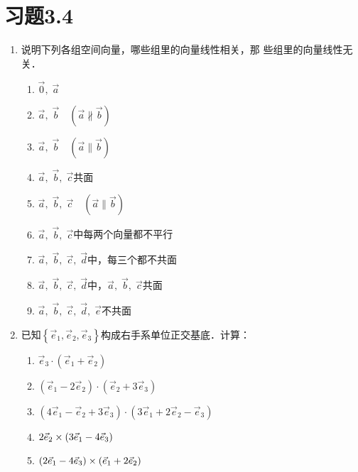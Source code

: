 \section*{习题3.4}

\begin{enumerate}
    \item 说明下列各组空间向量，哪些组里的向量线性相关，那
    些组里的向量线性无关．
    \begin{multicols}{2}
\begin{enumerate}
    \item $\vec{0},\; \vec{a}$
    \item $\vec{a},\; \vec{b}\quad (\vec{a}\nparallel\vec{b})$
    \item $\vec{a},\; \vec{b}\quad (\vec{a}\parallel\vec{b})$
    \item $\vec{a},\; \vec{b},\; \vec{c}$共面
    \item $\vec{a},\; \vec{b},\; \vec{c}\quad (\vec{a}\parallel\vec{b})$
    \item $\vec{a},\; \vec{b},\; \vec{c}$中每两个向量都不平行
    \item $\vec{a},\; \vec{b},\; \vec{c},\; \vec{d}$中，每三个都不共面
    \item $\vec{a},\; \vec{b},\; \vec{c},\; \vec{d}$中，$\vec{a},\; \vec{b},\; \vec{c}$共面
    \item $\vec{a},\; \vec{b},\; \vec{c},\; \vec{d},\; \vec{e}$不共面
 \end{enumerate}           
    \end{multicols}

\item 已知$\left\{\vec{e}_1,\vec{e}_2,\vec{e}_3\right\}$构成右手系单位正交基底．计算：
\begin{multicols}{2}
    \begin{enumerate}
\item $\vec{e}_3\cdot \left(\vec{e}_1+\vec{e}_2\right)$
\item $\left(\vec{e}_1-2\vec{e}_2\right)\cdot \left(\vec{e}_2+3\vec{e}_3\right)$
\item $\left(4\vec{e}_1-\vec{e}_2+3\vec{e}_3\right)\cdot \left(3\vec{e}_1+2\vec{e}_2-\vec{e}_3\right)$
\item $2\vec{e}_2\times \left(3\vec{e}_1-4\vec{e}_3\right)$
\item $\left(2\vec{e}_1-4\vec{e}_3\right)\times \left(\vec{e}_1+2\vec{e}_2\right)$
 \end{enumerate}           
    \end{multicols}


\end{enumerate}
